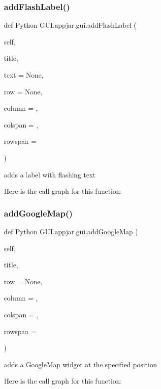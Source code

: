 \subsubsection{\texorpdfstring{add\+Flash\+Label()}{addFlashLabel()}}
{\footnotesize\ttfamily def Python G\+U\+I.\+appjar.\+gui.\+add\+Flash\+Label (\begin{DoxyParamCaption}\item[{}]{self,  }\item[{}]{title,  }\item[{}]{text = {\ttfamily None},  }\item[{}]{row = {\ttfamily None},  }\item[{}]{column = {},  }\item[{}]{colspan = {},  }\item[{}]{rowspan = {} }\end{DoxyParamCaption})}

\begin{DoxyVerb}adds a label with flashing text \end{DoxyVerb}
 Here is the call graph for this function\+:
\mbox{\label{class_python_01_g_u_i_1_1appjar_1_1gui_aa1e4b75d2692f52d11e1c9e28ccf4e27}} 
\subsubsection{\texorpdfstring{add\+Google\+Map()}{addGoogleMap()}}
{\footnotesize\ttfamily def Python G\+U\+I.\+appjar.\+gui.\+add\+Google\+Map (\begin{DoxyParamCaption}\item[{}]{self,  }\item[{}]{title,  }\item[{}]{row = {\ttfamily None},  }\item[{}]{column = {},  }\item[{}]{colspan = {},  }\item[{}]{rowspan = {} }\end{DoxyParamCaption})}

\begin{DoxyVerb}adds a GoogleMap widget at the specified position \end{DoxyVerb}
 Here is the call graph for this function\+:
\mbox{\label{class_python_01_g_u_i_1_1appjar_1_1gui_abcc4ab3e43d1c126773b6131fcfca071}} 
